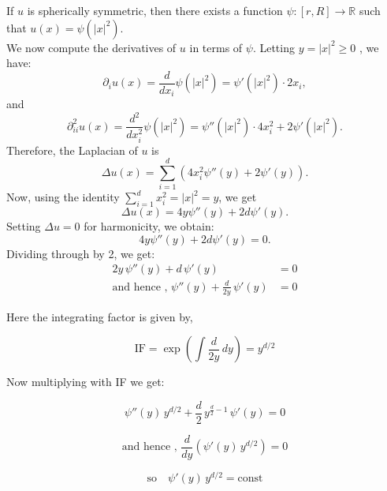 \documentclass[11pt, a4paper, oneside]{report}
\numberwithin{equation}{section}
\begin{document}
If \( u \) is spherically symmetric, then there exists a function \( \psi : [r, R] \to \mathbb{R} \) such that \(u(x) = \psi(|x|^2).\) \\
We now compute the derivatives of \( u \) in terms of \( \psi \). Letting \( y = |x|^2 \geq 0 \) , we have:
\[
\partial_{i} u(x) = \frac{d}{dx_i} \psi(|x|^2) = \psi'(|x|^2) \cdot 2x_i,
\]
and
\[
\partial_{ii}^2 u(x) = \frac{d^2}{dx_i^2} \psi(|x|^2) = \psi''(|x|^2) \cdot 4x_i^2 + 2\psi'(|x|^2).
\]
Therefore, the Laplacian of \( u \) is
\[
\Delta u(x) = \sum_{i=1}^d \left( 4x_i^2 \psi''(y) + 2\psi'(y) \right).
\]
Now, using the identity \( \sum_{i=1}^d x_i^2 = |x|^2 = y \), we get
\[
\Delta u(x) = 4y \psi''(y) + 2d \psi'(y).
\]
Setting \( \Delta u = 0 \) for harmonicity, we obtain:
\[
4y \psi''(y) + 2d \psi'(y) = 0.
\]
Dividing through by 2, we get:
\begin{align*}
    2y \, \psi''(y) + d \, \psi'(y) &= 0 \\
    \text{and hence , } \psi''(y) + \frac{d}{2y} \, \psi'(y) &= 0
\end{align*}

Here the integrating factor is given by, 

\[
\text{IF} = \exp\left( \int \frac{d}{2y} \, dy \right) = y^{d/2}
\]

Now multiplying with IF we get:

\[
\psi''(y) \, y^{d/2} + \frac{d}{2} \, y^{\frac{d}{2}-1} \, \psi'(y) = 0
\]

\[
\text{and hence , }\frac{d}{dy} \left( \psi'(y) \, y^{d/2} \right) = 0
\]

\[
\text{so} \quad \psi'(y) \, y^{d/2} = \text{const}
\]
\end{document}
